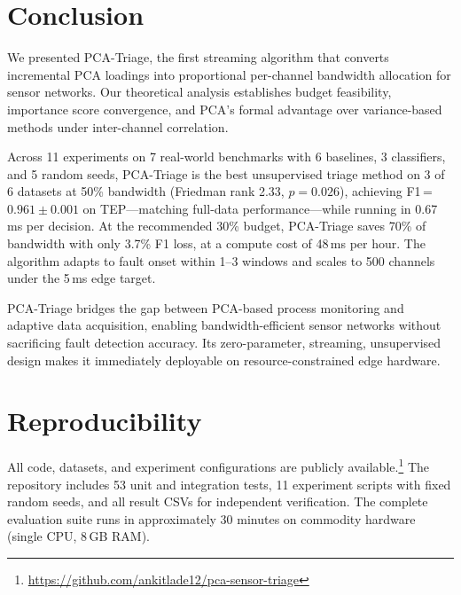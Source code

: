 \documentclass[journal]{IEEEtran}
\begin{document}
\section{Conclusion}
\label{sec:conclusion}

We presented PCA-Triage, the first streaming algorithm that converts incremental PCA loadings into proportional per-channel bandwidth allocation for sensor networks. Our theoretical analysis establishes budget feasibility, importance score convergence, and PCA's formal advantage over variance-based methods under inter-channel correlation.

Across 11 experiments on 7 real-world benchmarks with 6 baselines, 3 classifiers, and 5 random seeds, PCA-Triage is the best unsupervised triage method on 3 of 6 datasets at 50\% bandwidth (Friedman rank 2.33, $p = 0.026$), achieving F1\,=\,$0.961 \pm 0.001$ on TEP---matching full-data performance---while running in 0.67\,ms per decision. At the recommended 30\% budget, PCA-Triage saves 70\% of bandwidth with only 3.7\% F1 loss, at a compute cost of 48\,ms per hour. The algorithm adapts to fault onset within 1--3 windows and scales to 500 channels under the 5\,ms edge target.

PCA-Triage bridges the gap between PCA-based process monitoring and adaptive data acquisition, enabling bandwidth-efficient sensor networks without sacrificing fault detection accuracy. Its zero-parameter, streaming, unsupervised design makes it immediately deployable on resource-constrained edge hardware.

\section*{Reproducibility}

All code, datasets, and experiment configurations are publicly available.\footnote{\url{https://github.com/ankitlade12/pca-sensor-triage}} The repository includes 53 unit and integration tests, 11 experiment scripts with fixed random seeds, and all result CSVs for independent verification. The complete evaluation suite runs in approximately 30 minutes on commodity hardware (single CPU, 8\,GB RAM).



\end{document}
